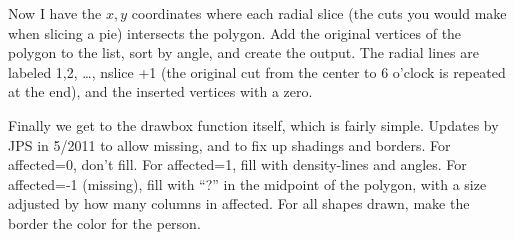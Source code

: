 \documentclass{article}
\begin{document}
Now I have the $x,y$ coordinates where each radial slice (the cuts you
would make when slicing a pie) intersects the polygon.  
Add the original vertices of the polygon to the list, sort by angle, and
create the output.  The radial lines are labeled 1,2, \ldots, nslice +1
(the original cut from the center to 6 o'clock is repeated at the end),   %
and the inserted vertices with a zero.

Finally we get to the drawbox function itself, which is fairly simple.
Updates by JPS in 5/2011 to allow missing, and to fix up shadings and borders.
For affected=0, don't fill.
For affected=1, fill with density-lines and angles.
For affected=-1 (missing), fill with ``?'' in the midpoint of the polygon,
with a size adjusted by how many columns in affected.
For all shapes drawn, make the border the color for the person.
\end{document}
